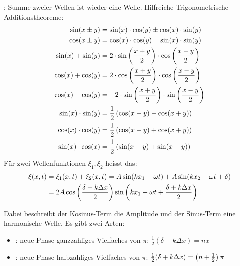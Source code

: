 \vspace{1\baselineskip}

: Summe zweier Wellen ist wieder eine Welle.
Hilfreiche Trigonometrische Additionstheoreme:
\begin{align*}
    \sin(x \pm y) &= \sin (x) \cdot \cos (y) \pm \cos(x) \cdot \sin(y)
    \\
    \cos(x \pm y) &= \cos(x) \cdot \cos(y) \mp \sin(x) \cdot \sin(y)
    \\
    \sin(x) + \sin(y) &= 2 \cdot \sin \left( \frac{x+y}{2} \right) \cdot \cos \left( \frac{x-y}{2} \right)
    \\
    \cos(x) + \cos(y) &= 2 \cdot \cos \left( \frac{x+y}{2} \right) \cdot \cos \left( \frac{x-y}{2} \right)
    \\
    \cos(x) - \cos(y) &= -2 \cdot \sin \left( \frac{x+y}{2} \right) \cdot \sin \left( \frac{x-y}{2} \right)
    \\
    \sin(x) \cdot \sin(y) &= \frac{1}{2} \left( \cos(x-y)-\cos(x+y) \right)
    \\
    \cos(x) \cdot \cos(y) &= \frac{1}{2} \left( \cos(x-y)+\cos(x+y) \right)
    \\
    \sin(x) \cdot \cos(x) &= \frac{1}{2} \left( \sin(x-y) + \sin(x+y) \right)
\end{align*}
Für zwei Wellenfunktionen $\xi_1 , \xi_2$ heisst das:
\begin{align*}
    \xi(x,t) &= \xi_1(x,t) + \xi_2 (x,t) = A \sin (kx_1 - \omega t) + A \sin (kx_2 - \omega t + \delta) \\
    &= 2 A \cos \left( \frac{\delta + k \Delta x}{2} \right) \sin \left( kx_1 - \omega t + \frac{\delta + k \Delta x}{2} \right)
\end{align*}

\pagebreak

Dabei beschreibt der Kosinus-Term die Amplitude und der Sinus-Term eine harmonische Welle.
Es gibt zwei Arten:
\begin{itemize}
    \item {}:    
        neue Phase ganzzahliges Vielfaches von $\pi$: $\frac{1}{2} (\delta + k \Delta x) = n x$
    \item {}:    
        neue Phase halbzahliges Vielfaches von $\pi$: $\frac{1}{2} (\delta + k \Delta x) =
        \left( n+\frac{1}{2} \right) \pi$
\end{itemize}

\vspace{1\baselineskip}


